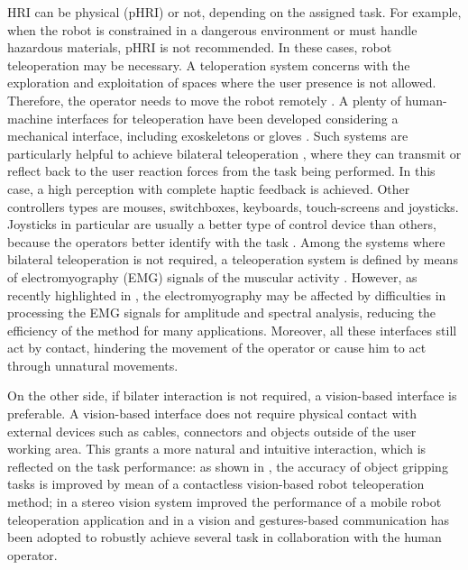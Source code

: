 \documentclass[a4paper, 10 pt, conference]{ieeeconf}      %
\begin{document}
HRI can be physical (pHRI) or not, depending on the assigned task. For example, when the robot is constrained in a dangerous environment or must handle hazardous materials, pHRI is not recommended. In these cases, robot teleoperation may be necessary. A teloperation system concerns with the exploration and exploitation of spaces where the user presence is not allowed. Therefore, the operator needs to move the robot remotely \cite{VERTUTJean}. A plenty of human-machine interfaces for teleoperation have been developed considering a mechanical interface, including exoskeletons \cite{Rebelo2014} or gloves \cite{Lv2006}. Such systems are particularly helpful to achieve bilateral teleoperation \cite{Hokayem2006}, where they can transmit or reflect back to the user reaction forces from the task being performed. In this case, a high perception with complete haptic feedback \cite{Glover2009} is achieved. Other controllers types are mouses, switchboxes, keyboards, touch-screens and joysticks. Joysticks in particular are usually a better type of control device than others, because the operators better identify with the task \cite{Boboc2012}. Among the systems where bilateral teleoperation is not required, a teleoperation system is defined by means of electromyography (EMG) signals of the muscular activity \cite{Vogel2011, Hassan2019}. However, as recently highlighted in \cite{Roveda2018a}, the electromyography may be affected by difficulties in processing the EMG signals for amplitude and spectral analysis, reducing the efficiency of the method for many applications. Moreover, all these interfaces still act by contact, hindering the movement of the operator or cause him to act through unnatural movements.

On the other side, if bilater interaction is not required, a vision-based interface is preferable. A vision-based interface does not require physical contact with external devices such as cables, connectors and objects outside of the user working area. This grants a more natural and intuitive interaction, which is reflected on the task performance: as shown in \cite{Kofman2005}, the accuracy of object gripping tasks is improved by mean of a contactless vision-based robot teleoperation method; in \cite{Livatino2009} a stereo vision system improved the performance of a mobile robot teleoperation application and in \cite{CollabWork} a vision and gestures-based communication has been adopted to robustly achieve several task in collaboration with the human operator. 
\end{document}
